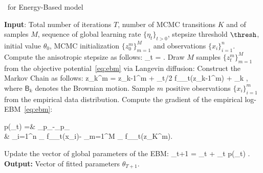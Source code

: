 \documentclass[letterpaper]{article} %
\begin{document}
\begin{algorithm}[H]
\caption{\algo\ for Energy-Based model} \label{alg:anila}
\begin{algorithmic}[1]
\STATE \textbf{Input}: Total number of iterations $T$, number of MCMC transitions $K$ and of samples $M$, sequence of global learning rate $\{\eta_t\}_{t >0}$, stepsize threshold $\thresh$, initial value $\theta_0$, MCMC initialization $\{ z_{0}^m \}_{m=1}^M$ and observations $\{ x_{i} \}_{i=1}^n$.
\STATE Compute the anisotropic stepsize as follows: \label{line:step}
\beq\label{eq:step}
\stepsize_t =  \eqsp.
\eeq
\STATE Draw $M$ samples $\{ z_{t}^m \}_{m=1}^M$ from the objective potential~\eqref{eq:ebm} via Langevin diffusion:\label{line:langevin}
\STATE Construct the Markov Chain as follows:
\beq\label{eq:anila}
z_{k}^{m} = z_{k-1}^m + \stepsize_t/2  \nabla f_{\theta_t}(z_{k-1}^m) +  _k \eqsp,
\eeq
where $\mathsf{B}_k$ denotes the Brownian motion.
\ENDFOR
\STATE Sample $m$ positive observations $\{ x_{i} \}_{i=1}^m$ from the empirical data distribution.
\STATE Compute the gradient of the empirical log-EBM~\eqref{eq:ebm}:
\beq\notag
\begin{split}
\nabla \log p(\theta_t) 
 =& _{p_{}}-_{p_{\theta}}\\
 &\hspace{-0.6in}\approx  {} \sum_{i=1}^{n} \nabla_{\theta} f_{\theta_t}\left(x_{i}\right)- \sum_{m=1}^{M} \nabla_{\theta} f_{\theta_t}\left(z_K^m\right)\eqsp.
\end{split}
\eeq
\STATE Update the vector of global parameters of the EBM:\label{line:gradient}
\beq\notag
\theta_{t+1} = \theta_{t} + \eta_t \nabla \log p(\theta_t) \eqsp.
\eeq
\ENDFOR
\STATE \textbf{Output:} Vector of fitted parameters $\theta_{T+1}$.
\end{algorithmic}
\end{algorithm}
\end{document}
